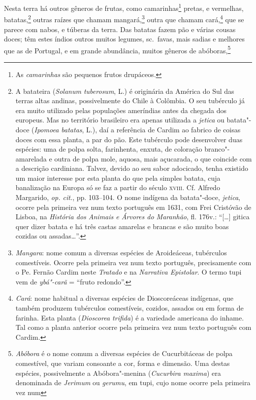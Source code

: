 \begin{linenumbers}
 Nesta terra há outros gêneros de frutas, como camarinhas\footnote{ As
\textit{camarinhas} são pequenos frutos drupáceos.} pretas, e
vermelhas, batatas,\footnote{ A batateira (\textit{Solanum tuberosum}, L.) 
é originária da América do Sul das terras altas andinas,
possivelmente do Chile à Colômbia. O seu tubérculo já era muito
utilizado pelas populações ameríndias antes da chegada dos europeus.
Mas no território brasileiro era apenas utilizada a \textit{jetica}
ou batata"-doce (\textit{Ipomoea batatas}, L.), daí a referência de
Cardim ao fabrico de coisas doces com essa planta, a par do pão. Este
tubérculo pode desenvolver duas espécies: uma de polpa solta,
farinhenta, enxuta, de coloração branco"-amarelada e outra de polpa
mole, aquosa, mais açucarada, o que coincide com a descrição
cardiniana. Talvez, devido ao seu sabor adocicado, tenha existido um
maior interesse por esta planta do que pela simples batata, cuja
banalização na Europa só se faz a partir do século \textsc{xviii}. Cf. Alfredo
Margarido, \textit{op. cit.}, pp. 103--104. O nome indígena da
batata"-doce, \textit{jetica}, ocorre pela primeira vez num texto
português em 1631, com Frei Cristóvão de Lisboa, na \textit{História
dos Animais e Árvores do Maranhão}, fl. 176v.: ``[\ldots{}] gitica quer dizer
batata e há três castas amarelas e brancas e são muito boas cozidas ou
assadas\ldots{}''.} outras raízes que chamam mangará,\footnote{ \textit{Mangara}: 
nome comum a diversas espécies de Aroideáceas,
tubérculos comestíveis. Ocorre pela primeira vez num texto português,
precisamente com o Pe. Fernão Cardim neste \textit{Tratado} e na
\textit{Narrativa Epistolar}. O termo tupi vem de \textit{ybá"-carã} = 
``fruto redondo''.} outra que chamam cará,\footnote{ \textit{Cará}: nome
habitual a diversas espécies de Dioscoreáceas indígenas, que também
produzem tubérculos comestíveis, cozidos, assados ou em forma de
farinha. Esta planta (\textit{Dioscorea trifida}) é a variedade
americana do inhame. Tal como a planta anterior ocorre pela primeira
vez num texto português com Cardim.} que se parece com nabos, e túberas
da terra. Das batatas fazem pão e várias cousas doces; têm estes índios
outros muitos legumes, sc.~favas, mais sadias e melhores que as de
Portugal, e em grande abundância, muitos gêneros de 
abóboras,\footnote{ \textit{Abóbora} é o nome comum a diversas espécies de
Cucurbitáceas de polpa comestível, que variam consoante a cor, forma e
dimensão. Uma destas espécies, possivelmente a Abóbora"-menina
(\textit{Cucurbira maxima}) era denominada de \textit{Jerimum}
ou \textit{gerumu}, em tupi, cujo nome ocorre pela primeira vez num
}
\end{linenumbers}
